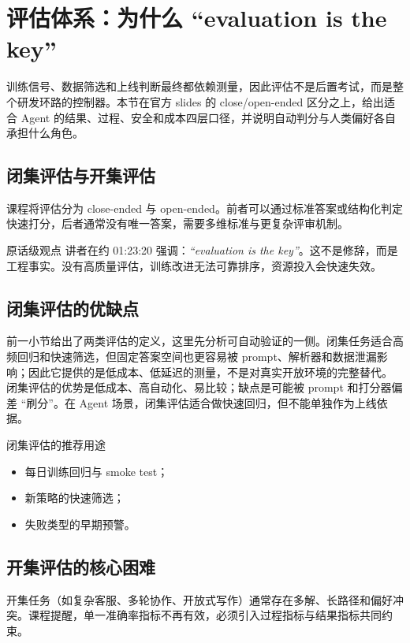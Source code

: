 \section{评估体系：为什么 ``evaluation is the key''}

训练信号、数据筛选和上线判断最终都依赖测量，因此评估不是后置考试，而是整个研发环路的控制器。本节在官方 slides 的 close/open-ended 区分之上，给出适合 Agent 的结果、过程、安全和成本四层口径，并说明自动判分与人类偏好各自承担什么角色。

\subsection{闭集评估与开集评估}
课程将评估分为 close-ended 与 open-ended。前者可以通过标准答案或结构化判定快速打分，后者通常没有唯一答案，需要多维标准与更复杂评审机制。

\begin{importantbox}{原话级观点}
讲者在约 01:23:20 强调：\textit{``evaluation is the key''}。这不是修辞，而是工程事实。没有高质量评估，训练改进无法可靠排序，资源投入会快速失效。
\end{importantbox}

\subsection{闭集评估的优缺点}
前一小节给出了两类评估的定义，这里先分析可自动验证的一侧。闭集任务适合高频回归和快速筛选，但固定答案空间也更容易被 prompt、解析器和数据泄漏影响；因此它提供的是低成本、低延迟的测量，不是对真实开放环境的完整替代。
闭集评估的优势是低成本、高自动化、易比较；缺点是可能被 prompt 和打分器偏差 ``刷分''。在 Agent 场景，闭集评估适合做快速回归，但不能单独作为上线依据。

\begin{knowledgebox}{闭集评估的推荐用途}
\begin{itemize}
    \item 每日训练回归与 smoke test；
    \item 新策略的快速筛选；
    \item 失败类型的早期预警。
\end{itemize}
\end{knowledgebox}

\subsection{开集评估的核心困难}
开集任务（如复杂客服、多轮协作、开放式写作）通常存在多解、长路径和偏好冲突。课程提醒，单一准确率指标不再有效，必须引入过程指标与结果指标共同约束。

